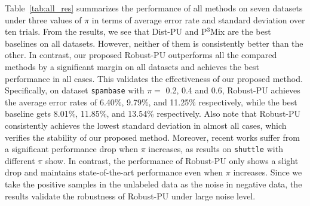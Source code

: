 \documentclass[sigconf]{acmart}
\newcommand{\ourmethod}{Robust-PU\xspace}
\begin{document}
Table~\ref{tab:all_res} summarizes the performance of all methods on seven datasets under three values of $\pi$ in terms of average error rate and standard deviation over ten trials. From the results, we see that Dist-PU and P$^3$Mix are the best baselines on all datasets. However, neither of them is consistently better than the other. In contrast, our proposed \ourmethod outperforms all the compared methods by a significant margin on all datasets and achieves the best performance in all cases. This validates the effectiveness of our proposed method. Specifically, on dataset \texttt{spambase} with $\pi=$ 0.2, 0.4 and 0.6, \ourmethod achieves the average error rates of 6.40\%, 9.79\%, and 11.25\% respectively, while the best baseline gets 8.01\%, 11.85\%, and 13.54\% respectively. Also note that \ourmethod consistently achieves the lowest standard deviation in almost all cases, which verifies the stability of our proposed method. Moreover, recent works suffer from a significant performance drop when $\pi$ increases, as results on \texttt{shuttle} with different $\pi$ show. In contrast, the performance of \ourmethod only shows a slight drop and maintains state-of-the-art performance even when $\pi$ increases. Since we take the positive samples in the unlabeled data as the noise in negative data, the results validate the robustness of \ourmethod under large noise level.

\begin{figure*}[htbp]
\centering
  \subfigure[\ourmethod]{
    \texttt{[image: fig/vis.pdf]}
  }
  \caption{UMAP visualization of the representations learned by (a) \ourmethod in the last three iterations and (b) Dist-PU on MNIST with $\pi=0.6$. Positive samples are blue and negative samples are red. 'x' represents labeled data and 'o' represents unlabeled data.}
  \label{fig:vis}
\end{figure*}
\end{document}
